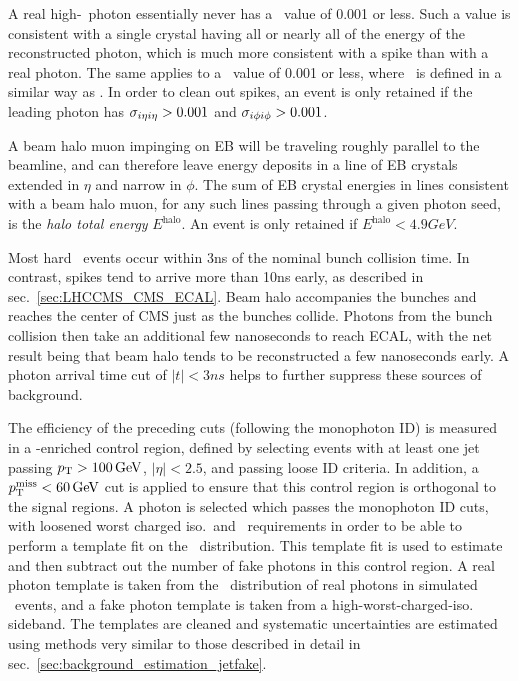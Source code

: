 A real high-\pT\ photon essentially never has a \sieie\ value of 0.001 or less. Such a value is consistent with a single crystal having all or nearly all of the energy of the
reconstructed photon, which is much more consistent with a spike than with a real photon. The same applies to a \sipip\ value of 0.001 or less, where \sipip\ is
defined in a similar way as \sieie. In order to clean out spikes, an event is only retained if the leading photon has $\sieie > 0.001$ and $\sipip > 0.001$.

A beam halo muon impinging on EB will be traveling roughly parallel to the beamline, and can therefore leave energy deposits in a line of EB crystals extended in $\eta$ and narrow in $\phi$.
The sum of EB crystal energies in lines consistent with a beam halo muon, for any such lines passing through a given photon seed,
is the \textit{halo total energy} $E^\mathrm{halo}$. An event is only retained if $E^\mathrm{halo} < 4.9\unit{GeV}$.

Most hard \zinvg\ events occur within 3\unit{ns} of the nominal bunch collision time. In contrast, spikes tend to arrive more than 10\unit{ns} early, as described in sec.~\ref{sec:LHCCMS_CMS_ECAL}.
Beam halo accompanies the bunches and reaches the center of CMS just as the bunches collide. Photons from the bunch collision then take an additional few nanoseconds to reach ECAL,
with the net result being that beam halo tends to be reconstructed a few nanoseconds early. A photon arrival time cut of $|t| < 3\unit{ns}$ helps to further suppress these sources of background.

The efficiency of the preceding cuts (following the monophoton ID) is measured in a \gjets-enriched control region, defined by selecting events with at least one jet passing $\pT > 100\unit{GeV}$,
$|\eta| < 2.5$, and passing loose ID criteria. In addition, a $\MET < 60\unit{GeV}$ cut is applied to ensure that this control region is orthogonal to the signal regions. A photon
is selected which passes the monophoton ID cuts, with loosened worst charged iso.\ and \sieie\ requirements in order to be able to perform a template fit on the \sieie\ distribution.
This template fit is used to estimate and then subtract out the number of fake photons in this control region. A real photon template is taken from the \sieie\ distribution of real photons in
simulated \gjets\ events, and a fake photon template is taken from a high-worst-charged-iso. sideband. The templates are cleaned and systematic uncertainties are estimated using methods
very similar to those described in detail in sec.~\ref{sec:background_estimation_jetfake}.

